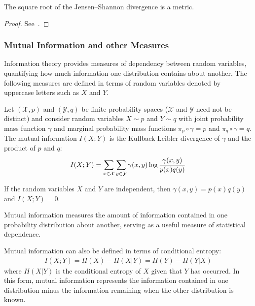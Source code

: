 \begin{theorem}
	The square root of the Jensen–Shannon divergence is a metric.
\end{theorem}

\begin{proof}
	See~\cite{ref:endres-2003}.
\end{proof}

\subsubsection*{Mutual Information and other Measures}

Information theory provides measures of dependency between random variables, quantifying how much information one distribution contains about another. The following measures are defined in terms of random variables denoted by uppercase letters such as $X$ and $Y$.

\begin{definition}
	Let $(\mathcal{X}, p)$ and $(\mathcal{Y}, q)$ be finite probability spaces ($\mathcal{X}$ and
	$\mathcal{Y}$ need not be distinct) and consider random variables $X \sim p$ and
	$Y \sim q$ with joint probability mass function $\gamma$ and marginal
	probability mass functions $\pi_p \circ \gamma = p$ and $\pi_q \circ \gamma =
		q$. The \textnormal{\sffamily mutual information} $I(X;Y)$ is the
	Kullback-Leibler divergence of $\gamma$ and the product of $p$ and $q$:
	\begin{align}
		\label{eq:mutual-information}
		I(X; Y) = \sum_{x \in \mathcal{X}}\sum_{y \in \mathcal{Y}}\gamma(x, y) \log{{\gamma(x, y) \over p(x)q(y)}}
	\end{align}
\end{definition}

\begin{theorem}
	If the random variables $X$ and $Y$ are independent, then $\gamma(x,y) =
		p(x)q(y)$ and $I(X; Y) = 0$.
\end{theorem}

\begin{remark}
	Mutual information measures the amount of information contained in one
	probability distribution about another, serving as a useful measure of
	statistical dependence.
\end{remark}

\begin{remark}
	Mutual information can also be defined in terms of conditional entropy:
	\begin{align}
		\label{eq:mutual-information-alt}
		I(X; Y) = H(X) - H(X | Y) = H(Y) - H(Y | X)
	\end{align}
	where $H(X | Y)$ is the conditional entropy of $X$ given that $Y$ has
	occurred. In this form, mutual information represents the information contained in one distribution minus the information remaining when the other distribution is known.
\end{remark}

